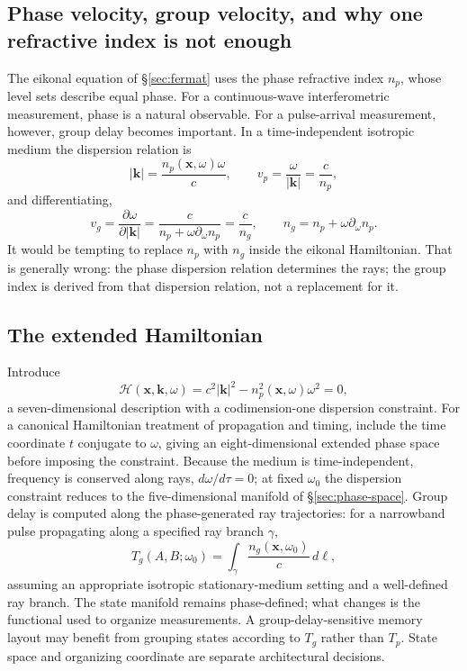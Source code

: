 \documentclass[11pt]{article}
\newcommand{\xv}{\mathbf{x}}
\begin{document}
\subsection{Phase velocity, group velocity, and why one refractive index is not enough}

The eikonal equation of \S\ref{sec:fermat} uses the phase refractive index $n_p$, whose
level sets describe equal phase. For a continuous-wave interferometric measurement,
phase is a natural observable. For a pulse-arrival measurement, however, group delay
becomes important. In a time-independent isotropic medium the dispersion relation is
\begin{equation}
|\mathbf{k}| = \frac{n_p(\xv,\omega)\omega}{c}, \qquad
v_p = \frac{\omega}{|\mathbf{k}|} = \frac{c}{n_p},
\end{equation}
and differentiating,
\begin{equation}
\boxed{v_g = \frac{\partial\omega}{\partial|\mathbf{k}|} = \frac{c}{n_p + \omega\partial_\omega n_p} = \frac{c}{n_g},}
\qquad n_g = n_p + \omega\partial_\omega n_p.
\end{equation}
It would be tempting to replace $n_p$ with $n_g$ inside the eikonal Hamiltonian. That is
generally wrong: the phase dispersion relation determines the rays; the group index is
derived from that dispersion relation, not a replacement for it.

\subsection{The extended Hamiltonian}

Introduce
\begin{equation}
\boxed{\mathcal{H}(\xv,\mathbf{k},\omega) = c^2|\mathbf{k}|^2 - n_p^2(\xv,\omega)\omega^2 = 0,}
\end{equation}
a seven-dimensional description with a codimension-one dispersion constraint. For a
canonical Hamiltonian treatment of propagation and timing, include the time coordinate
$t$ conjugate to $\omega$, giving an eight-dimensional extended phase space before
imposing the constraint. Because the medium is time-independent, frequency is conserved
along rays, $d\omega/d\tau = 0$; at fixed $\omega_0$ the dispersion constraint reduces
to the five-dimensional manifold of \S\ref{sec:phase-space}. Group delay is computed
along the phase-generated ray trajectories: for a narrowband pulse propagating along a
specified ray branch $\gamma$,
\begin{equation}
\boxed{T_g(A,B;\omega_0) = \int_\gamma \frac{n_g(\xv,\omega_0)}{c}\, d\ell,}
\end{equation}
assuming an appropriate isotropic stationary-medium setting and a well-defined ray
branch. The state manifold remains phase-defined; what changes is the functional used to
organize measurements. A group-delay-sensitive memory layout may benefit from grouping
states according to $T_g$ rather than $T_p$. State space and organizing coordinate are
separate architectural decisions.
\end{document}
